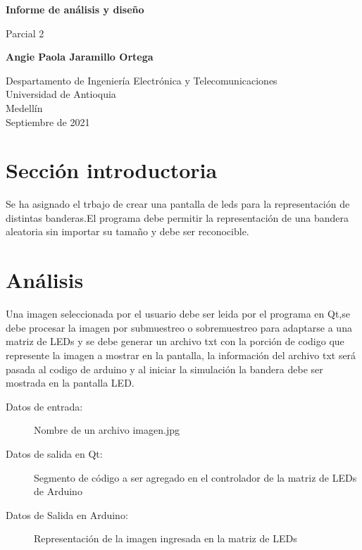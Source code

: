 \documentclass{article}
\begin{document}
\begin{titlepage}
    \begin{center}
        \vspace*{1cm}
            
        \Huge
        \textbf{Informe de análisis y diseño}
            
        \vspace{0.5cm}
        \LARGE
        Parcial 2
            
        \vspace{1.5cm}
            
        \textbf{Angie Paola Jaramillo Ortega}
            
        \vfill
            
        \vspace{0.8cm}
            
        \Large
        Despartamento de Ingeniería Electrónica y Telecomunicaciones\\
        Universidad de Antioquia\\
        Medellín\\
        Septiembre de 2021
            
    \end{center}
\end{titlepage}

\tableofcontents
\newpage
\section{Sección introductoria}\label{intro}
Se ha asignado el trbajo de crear una pantalla de leds para la representación de distintas banderas.El programa debe permitir la representación de una bandera aleatoria sin importar su tamaño y debe ser reconocible.

\section{Análisis} \label{Análisis}
Una imagen seleccionada por el usuario debe ser leida por el programa en Qt,se debe procesar la imagen por submuestreo o sobremuestreo para adaptarse a una matriz de LEDs y se debe generar un archivo txt con la porción de codigo que represente la imagen a mostrar en la pantalla, la información del archivo txt será pasada al codigo de arduino y al iniciar la simulación la bandera debe ser mostrada en la pantalla LED.

\begin{description}
   \item[Datos de entrada:] Nombre de un archivo imagen.jpg 
   \item[Datos de salida en Qt:] Segmento de código a ser agregado en el controlador de la matriz de LEDs de Arduino 
   \item[Datos de Salida en Arduino:] Representación de la imagen ingresada en la matriz de LEDs
\end{description}
\end{document}
